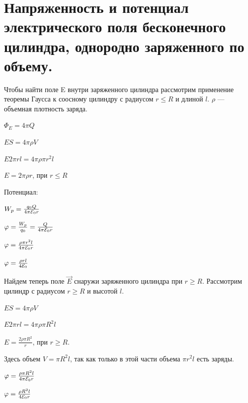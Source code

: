 \documentclass[12pt]{report}
\begin{document}
\section{Напряженность и потенциал электрического поля бесконечного цилиндра, однородно заряженного по объему.}
Чтобы найти поле E внутри заряженного цилиндра рассмотрим применение теоремы Гаусса к соосному цилиндру с радиусом $r \leq R$ и длиной $l$. $\rho$ --- объемная плотность заряда.
\begin{center}
    $\Phi_E = 4 \pi Q$
\end{center}
\begin{center}
    $ES = 4 \pi \rho V$
\end{center}
\begin{center}
    $E 2\pi r l = 4 \pi \rho \pi r^2 l$
\end{center}
\begin{center}
    $E = 2 \pi \rho r$, при $r \leq R$
\end{center}
\par Потенциал:
\begin{center}
    $W_p = \frac{q_0 Q}{4 \pi \varE_0 r}$
\end{center}
\begin{center}
    $\varphi = \frac{W_p}{q_0} = \frac{Q}{4 \pi \varE_0 r}$
\end{center}
\begin{center}
    $\varphi = \frac{\rho \pi r^2 l}{4 \pi \varE_0 r} $
\end{center}
\begin{center}
    $\varphi = \frac{\rho r l}{4 \varE_0}$
\end{center}
Найдем теперь поле $\vec{E}$ снаружи заряженного цилиндра при $r \geq R$.
Рассмотрим цилиндр с радиусом $r \geq R$ и высотой $l$.
\begin{center}
    $ES = 4 \pi \rho V$
\end{center}
\begin{center}
    $E 2 \pi r l = 4 \pi \rho \pi R^2 l$
\end{center}
\begin{center}
    $E = \frac{2 \rho \pi R^2}{r}$, при $r \geq R$.
\end{center}
Здесь объем $V = \pi R^2 l$, так как только в этой части объема $\pi r^2 l$ есть
заряды.
\begin{center}
    $\varphi = \frac{\rho \pi R^2 l}{4 \pi \varE_0 r} $
\end{center}
\begin{center}
    $\varphi = \frac{\rho R^2 l}{4 \varE_0 r} $
\end{center}
\end{document}
